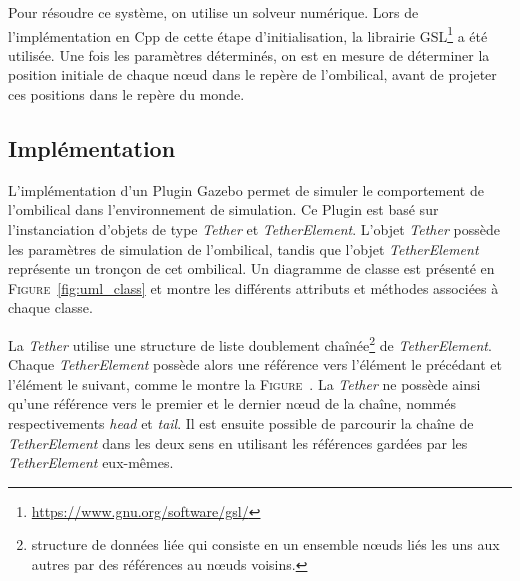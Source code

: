     Pour résoudre ce système, on utilise un solveur numérique. Lors de l'implémentation en \gls{Cpp} de cette étape d'initialisation, la librairie \gls{GSL}\footnote{\url{https://www.gnu.org/software/gsl/}} a été utilisée. Une fois les paramètres déterminés, on est en mesure de déterminer la position initiale de chaque n\oe ud dans le repère de l'ombilical, avant de projeter ces positions dans le repère du monde.

\subsection{Implémentation}
    L'implémentation d'un \gls{Plugin} \gls{Gazebo} permet de simuler le comportement de l'ombilical dans l'environnement de simulation. Ce \gls{Plugin} est basé sur l'instanciation d'objets de type \textit{Tether} et \textit{TetherElement}. L'objet \textit{Tether} possède les paramètres de simulation de l'ombilical, tandis que l'objet \textit{TetherElement} représente un tronçon de cet ombilical. Un diagramme de classe est présenté en \textsc{Figure}~\ref{fig:uml_class} et montre les différents attributs et méthodes associées à chaque classe.
    
    La \textit{Tether} utilise une structure de liste doublement chaînée\footnote{structure de données liée qui consiste en un ensemble n\oe uds liés les uns aux autres par des références au n\oe uds voisins.} de \textit{TetherElement}. Chaque \textit{TetherElement} possède alors une référence vers l'élément le précédant et l'élément le suivant, comme le montre la \textsc{Figure}~\label{fig:goubly_linked_list}. La \textit{Tether} ne possède ainsi qu'une référence vers le premier et le dernier n\oe ud de la chaîne, nommés respectivements \textit{head} et \textit{tail}. Il est ensuite possible de parcourir la chaîne de \textit{TetherElement} dans les deux sens en utilisant les références gardées par les \textit{TetherElement} eux-mêmes. 


